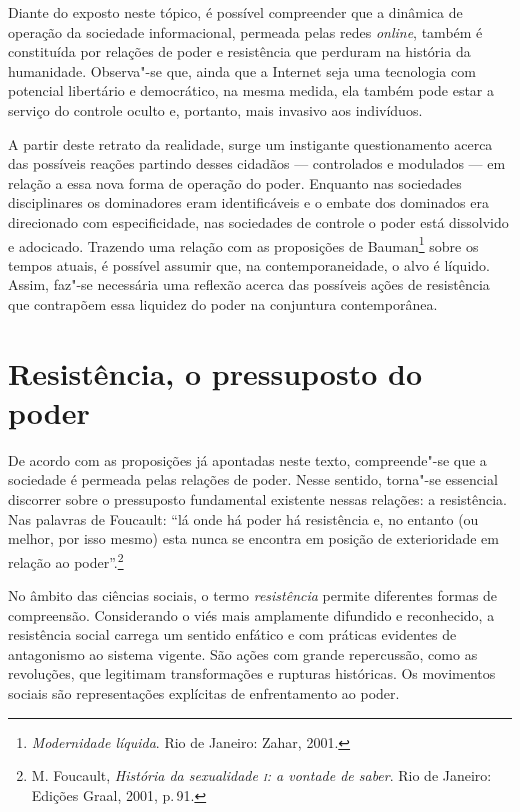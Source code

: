 Diante do exposto neste tópico, é possível compreender que a dinâmica de
operação da sociedade informacional, permeada pelas redes \textit{online}, também
é constituída por relações de poder e resistência que perduram na
história da humanidade. Observa"-se que, ainda que a Internet seja uma
tecnologia com potencial libertário e democrático, na mesma medida, ela
também pode estar a serviço do controle oculto e, portanto, mais
invasivo aos indivíduos.

A partir deste retrato da realidade, surge um instigante questionamento
acerca das possíveis reações partindo desses cidadãos --- controlados e
modulados --- em relação a essa nova forma de operação do poder. Enquanto
nas sociedades disciplinares os dominadores eram identificáveis e o
embate dos dominados era direcionado com especificidade, nas sociedades
de controle o poder está dissolvido e adocicado. Trazendo uma relação
com as proposições de Bauman\footnote{\textit{Modernidade líquida}. Rio de Janeiro: Zahar, 2001.} sobre os tempos atuais, é possível
assumir que, na contemporaneidade, o alvo é líquido. Assim, faz"-se
necessária uma reflexão acerca das possíveis ações de resistência que
contrapõem essa liquidez do poder na conjuntura contemporânea.

\section{Resistência, o pressuposto do poder}

De acordo com as proposições já apontadas neste texto, compreende"-se que
a sociedade é permeada pelas relações de poder. Nesse sentido, torna"-se
essencial discorrer sobre o pressuposto fundamental existente nessas
relações: a resistência. Nas palavras de Foucault: ``lá onde há poder há
resistência e, no entanto (ou melhor, por isso mesmo) esta nunca se
encontra em posição de exterioridade em relação ao poder''.\footnote{M. Foucault, \textit{História da sexualidade \textsc{i}: a vontade de saber}. Rio de Janeiro: Edições Graal, 2001, p.\,91.}

No âmbito das ciências sociais, o termo \textit{resistência} permite
diferentes formas de compreensão. Considerando o viés mais amplamente
difundido e reconhecido, a resistência social carrega um sentido
enfático e com práticas evidentes de antagonismo ao sistema vigente. São
ações com grande repercussão, como as revoluções, que legitimam
transformações e rupturas históricas. Os movimentos sociais são
representações explícitas de enfrentamento ao poder.

